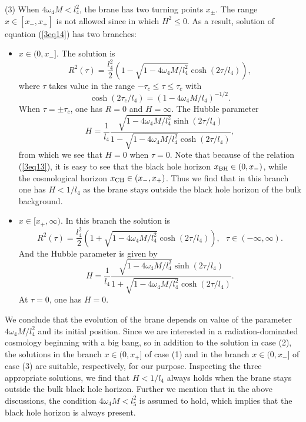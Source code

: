 \documentclass[a4paper,12pt]{article}
\begin{document}
    (3) When $4\omega_4 M <l_4^2$, the brane has two turning 
 points $x_{\pm}$. The range $x \in [x_-,x_+]$ is not allowed  since in which 
$H^2 \le 0$. As a result,  solution of 
  equation (\ref{3eq14}) has   two branches:
  \begin{itemize}
  \item $x\in (0, x_-]$. The solution is
  \begin{equation}
  R^2(\tau)= \frac{l_4^2}{2}\left(1
  -\sqrt{1-4\omega_4M/l_4^2}\cosh(2\tau/l_4)\right),
  \end{equation}
  where $\tau$ takes value in the range $-\tau_c \le \tau \le
  \tau_c$ with
\begin{equation}
 \cosh(2\tau_c/l_4)=(1-4\omega_4M/l_4)^{-1/2}.
 \end{equation}
  When $\tau =\pm \tau_c$, one has $R=0$ and $H= \infty$.
  The Hubble parameter
  \begin{equation}
  H
  =\frac{1}{l_4}\frac{\sqrt{1-4\omega_4 M/l_4^2}\sinh(2\tau/l_4)}
    {1-\sqrt{1-4\omega_4M/l_4^2}\cosh(2\tau/l_4)},
    \end{equation}
    from which we see that $H=0$ when $\tau=0$.
Note that because of the relation (\ref{3eq13}),
it is easy to see that the black hole horizon $x_{\rm BH} \in
 (0, x_-)$, while the cosmological horizon 
$x_{\rm CH} \in (x_-, x_+)$.
 Thus we find that in this branch one has $H <1/l_4$ as
 the brane stays outside the black hole horizon  of the bulk
 background.

  \item $x\in[x_+,\infty)$. In this branch the solution is
  \begin{equation}
  R^2(\tau)=\frac{l^2_4}{2}\left( 1+\sqrt{1-4\omega_4
  M/l_4^2}\cosh(2\tau/l_4)\right), \ \ \ \tau \in (-\infty,
  \infty).
  \end{equation}
  And the Hubble parameter is given by
  \begin{equation}
  H =\frac{1}{l_4}\frac{\sqrt{1-4\omega_4 M/l_4^2}\sinh(2\tau/l_4)}
    {1+\sqrt{1-4\omega_4M/l_4^2}\cosh(2\tau/l_4)}.
    \end{equation}
  At $\tau=0$, one has $H=0$.
\end{itemize}
We conclude that the evolution of the brane depends on value of the
parameter $4\omega_4M/l_4^2$ and its initial position. Since we
are interested in a radiation-dominated cosmology beginning with a
big bang, so in addition to the solution in case (2),  
the solutions in the branch $x \in (0,x_+]$ of  case (1) and in the branch 
$x \in (0, x_-]$  of case (3) are suitable, respectively, for our purpose. 
Inspecting the three appropriate  solutions, we find that  $H <1/l_4$ always 
holds when the brane stays outside the
bulk black hole horizon. Further we mention that in the above discussions, 
the condition $4\omega_4M <l^2_5$ is assumed to hold, which implies that the
black hole horizon is always present.
\end{document}
